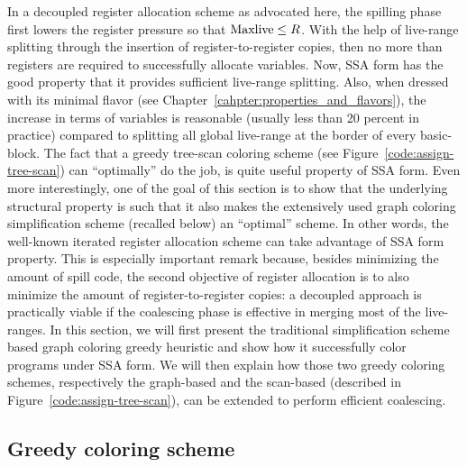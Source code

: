 {In a decoupled register allocation scheme as advocated here, the spilling phase first lowers the register pressure so that $\mathrm{Maxlive} \leq R$.
With the help of live-range splitting through the insertion of register-to-register copies, then no more than \regs registers are required to successfully allocate variables.
Now, SSA form has the good property that it provides sufficient live-range splitting.
Also, when dressed with its minimal flavor (see Chapter~\ref{cahpter:properties_and_flavors}), the increase in terms of variables is reasonable (usually less than 20 percent in practice) compared to splitting all global live-range at the border of every basic-block.
The fact that a greedy tree-scan coloring scheme (see Figure~\ref{code:assign-tree-scan}) can ``optimally'' do the job, is quite useful property of SSA form.
Even more interestingly, one of the goal of this section is to show that the underlying structural property is such that it also makes the extensively used graph coloring simplification scheme (recalled below) an ``optimal'' scheme.
In other words, the well-known iterated register allocation scheme can take advantage of SSA form property.
This is especially important remark because, besides minimizing the amount of spill code, the second objective of register allocation is to also minimize the amount of register-to-register copies:
a decoupled approach is practically viable if the coalescing phase is effective in merging most of the live-ranges.
In this section, we will first present the traditional simplification scheme based graph coloring greedy heuristic and show how it successfully color programs under SSA form.
We will then explain how those two greedy coloring schemes, respectively the graph-based and the scan-based (described in Figure~\ref{code:assign-tree-scan}), can be extended to perform efficient coalescing.

 

\subsection{Greedy coloring scheme}
\label{sec:ra:greedy-col}

}
